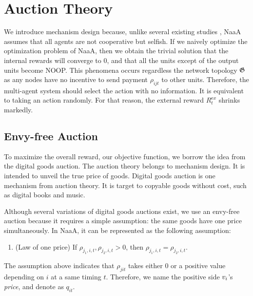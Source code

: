 \section{Auction Theory}


We introduce mechanism design because, unlike several existing studies \citep{sukhbaatar2016learning}, NaaA assumes that all agents are not cooperative but selfish.
If we naively optimize the optimization problem of NaaA, then we obtain the trivial solution that the internal rewards will converge to 0, and that all the units except of the output units become NOOP.
This phenomena occurs regardless the network topology $\mathfrak{G}$ as any nodes have no incentive to send payment $\rho_{ijt}$ to other units.
Therefore, the multi-agent system should select the action with no information. It is equivalent to taking an action randomly.
For that reason, the external reward $R_t^{\mathrm ex}$ shrinks markedly.

\subsection{Envy-free Auction}
To maximize the overall reward, our objective function, we borrow the idea from the digital goods auction.
The auction theory belongs to mechanism design. It is intended to unveil the true price of goods.
Digital goods auction is one mechanism from auction theory.
It is target to copyable goods without cost, such as digital books and music.

Although several variations of digital goods auctions exist,
we use an envy-free auction \citep{guruswami2005profit} because it requires a simple assumption: the same goods have one price simultaneously.
In NaaA, it can be represented as the following assumption:
\begin{enumerate}
\renewcommand{\labelenumi}{N\arabic{enumi}:}
\setcounter{enumi}{4}
\item (Law of one price)
	If $\rho_{j_1,i,t}, \rho_{j_2,i,t} > 0$, then $\rho_{j_1,i,t} = \rho_{j_2,i,t}$.
\end{enumerate}
The assumption above indicates that $\rho_{jit}$ takes either 0 or a positive value depending on $i$ at a same timing $t$.
Therefore, we name the positive side $v_{i}$'s {\em price}, and denote as $q_{it}$.

